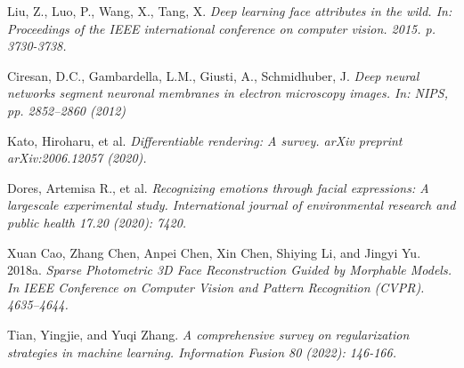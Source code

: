 \documentclass[12pt,a4]{article}
\begin{document}
\begin{thebibliography}{9}
    Liu, Z., Luo, P., Wang, X., Tang, X.
    \textit{Deep learning face attributes in the wild. In: Proceedings of the IEEE international conference on computer vision. 2015. p. 3730-3738.}

    Ciresan, D.C., Gambardella, L.M., Giusti, A., Schmidhuber, J.
    \textit{Deep neural networks segment neuronal membranes in electron microscopy images. In: NIPS, pp. 2852–2860 (2012)}

    Kato, Hiroharu, et al.
    \textit{Differentiable rendering: A survey. arXiv preprint arXiv:2006.12057 (2020).}

    Dores, Artemisa R., et al.
    \textit{Recognizing emotions through facial expressions: A largescale experimental study. International journal of environmental research and public health 17.20 (2020): 7420.}

    Xuan Cao, Zhang Chen, Anpei Chen, Xin Chen, Shiying Li, and Jingyi Yu. 2018a.
    \textit{Sparse Photometric 3D Face Reconstruction Guided by Morphable Models. In    IEEE Conference on Computer Vision and Pattern Recognition (CVPR). 4635–4644.}

    Tian, Yingjie, and Yuqi Zhang.
    \textit{A comprehensive survey on regularization strategies in machine learning. Information Fusion 80 (2022): 146-166.}

	\end{thebibliography}
\end{document}
